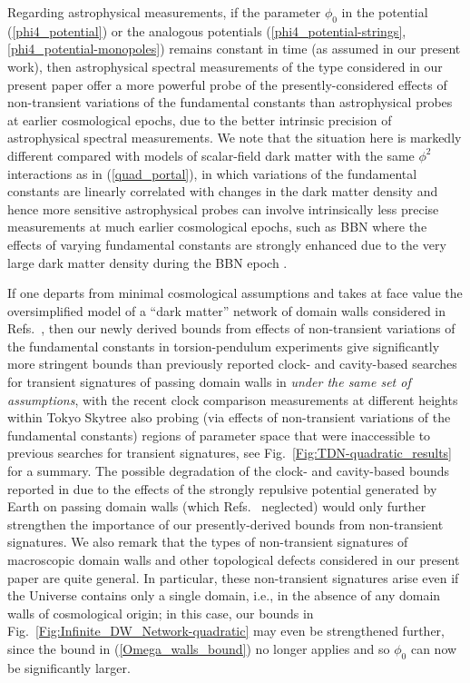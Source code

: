 \documentclass[aps,prd,onecolumn,nofootinbib]{revtex4-2} %
\begin{document}
Regarding astrophysical measurements, if the parameter $\phi_0$ in the potential (\ref{phi4_potential}) or the analogous potentials (\ref{phi4_potential-strings},\ref{phi4_potential-monopoles}) remains constant in time (as assumed in our present work), then astrophysical spectral measurements of the type considered in our present paper offer a more powerful probe of the presently-considered effects of non-transient variations of the fundamental constants than astrophysical probes at earlier cosmological epochs, due to the better intrinsic precision of astrophysical spectral measurements. 
We note that the situation here is markedly different compared with models of scalar-field dark matter with the same $\phi^2$ interactions as in (\ref{quad_portal}), in which variations of the fundamental constants are linearly correlated with changes in the dark matter density and hence more sensitive astrophysical probes can involve intrinsically less precise measurements at much earlier cosmological epochs, such as BBN where the effects of varying fundamental constants are strongly enhanced due to the very large dark matter density during the BBN epoch \cite{Stadnik_2015_DM-VFCs}. 

If one departs from minimal cosmological assumptions and takes at face value the oversimplified model of a ``dark matter'' network of domain walls considered in Refs.~\cite{Derevianko_2014_TDM-clocks,Wcislo_2016_TDM-cavity,Roberts_2017_TDM-GPS,Wcislo_2018_TDM-cavity,Roberts_2019_TDM-clocks}, then our newly derived bounds from effects of non-transient variations of the fundamental constants in torsion-pendulum experiments give significantly more stringent bounds than previously reported clock- and cavity-based searches for transient signatures of passing domain walls in \cite{Wcislo_2016_TDM-cavity,Roberts_2017_TDM-GPS,Wcislo_2018_TDM-cavity,Roberts_2019_TDM-clocks} \textit{under the same set of assumptions}, with the recent clock comparison measurements at different heights within Tokyo Skytree also probing (via effects of non-transient variations of the fundamental constants) regions of parameter space that were inaccessible to previous searches for transient signatures, see Fig.~\ref{Fig:TDN-quadratic_results} for a summary. 
The possible degradation of the clock- and cavity-based bounds reported in \cite{Wcislo_2016_TDM-cavity,Roberts_2017_TDM-GPS,Wcislo_2018_TDM-cavity,Roberts_2019_TDM-clocks} due to the effects of the strongly repulsive potential generated by Earth on passing domain walls (which Refs.~\cite{Wcislo_2016_TDM-cavity,Roberts_2017_TDM-GPS,Wcislo_2018_TDM-cavity,Roberts_2019_TDM-clocks} neglected) would only further strengthen the importance of our presently-derived bounds from non-transient signatures. 
We also remark that the types of non-transient signatures of macroscopic domain walls and other topological defects considered in our present paper are quite general. 
In particular, these non-transient signatures arise even if the Universe contains only a single domain, i.e., in the absence of any domain walls of cosmological origin; 
in this case, our bounds in Fig.~\ref{Fig:Infinite_DW_Network-quadratic} may even be strengthened further, since the bound in (\ref{Omega_walls_bound}) no longer applies and so $\phi_0$ can now be significantly larger. 
\end{document}

